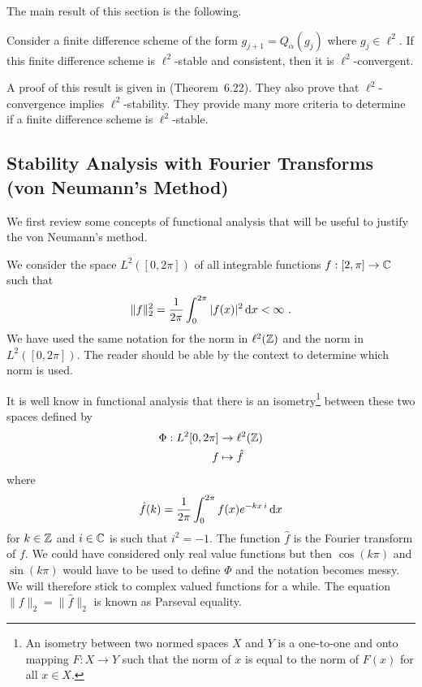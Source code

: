 The main result of this section is the following.

\begin{theorem} \label{ell2StabConstConv}
Consider a finite difference scheme of the form $g_{j+1} = Q_\alpha(g_j)$
where $g_j \in \ell^2$.   If this finite difference scheme is
$\ell^2$-stable and consistent, then it is $\ell^2$-convergent. 
\end{theorem}

A proof of this result is given in \cite{WH} (Theorem~6.22).  They
also prove that $\ell^2$-convergence implies $\ell^2$-stability.  They
provide many more criteria to determine if a finite difference scheme is
$\ell^2$-stable.

\subsection[von Neumann's Method]{Stability Analysis with Fourier
Transforms (von Neumann's Method)} \label{vonNewmannMeth}

We first review some concepts of functional analysis that will be
useful to justify the von Neumann's method.

We consider the space $L^2([0,2\pi])$ of all integrable
functions $f:[2,\pi] \to \mathbb{C}$ such that
\[
  \|f\|_2^2 = \frac{1}{2\pi} \int_0^{2\pi} |f(x)|^2 \,\mathrm{d}x < \infty \ .
\]
We have used the same notation for the norm in $\ell^2(\mathbb{Z})$ and the norm
in $L^2([0,2\pi])$.  The reader should be able by the context to
determine which norm is used. 

It is well know in functional analysis that there is an
isometry\footnote{An isometry between two normed spaces $X$ and $Y$
is a one-to-one and onto mapping $F:X \to Y$ such that the norm of $x$
is equal to the norm of $F(x)$ for all $x \in X$.}
between these two spaces defined by
\begin{align*}
\Phi : L^2{[0,2\pi]} & \to \ell^2(\mathbb{Z}) \\
f & \mapsto \hat{f}
\end{align*}
where
\[
  \hat{f}(k) = \frac{1}{2\pi} \int_0^{2\pi} f(x) e^{-k x\,i} \,\mathrm{d}x
\]
for $k\in \mathbb{Z}$ and $i \in \mathbb{C}$ is such that $i^2 =-1$.  The function
$\hat{f}$ is the Fourier transform of $f$.  We could have
considered only real value functions but then $\cos(k \pi)$ and
$\sin(k \pi)$ would have to be used to define $\Phi$ and the notation
becomes messy.  We will therefore stick to complex valued functions
for a while.  The equation $\|f\|_2 = \|\hat{f}\|_2$ is known as
Parseval equality.

